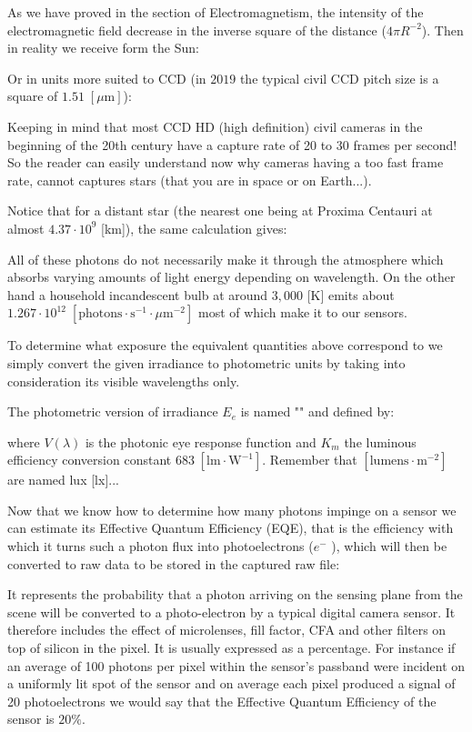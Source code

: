 	As we have proved in the section of Electromagnetism, the intensity of the electromagnetic field decrease in the inverse square of the distance ($4\pi R^{-2}$). Then in reality we receive form the Sun:
	
	Or in units more suited to CCD (in $2019$ the typical civil CCD pitch size is a square of $1.51\;[\mu\text{m}]$):
	
	Keeping in mind that most CCD HD (high definition) civil cameras in the beginning of the 20th century have a capture rate of 20 to 30 frames per second! So the reader can easily understand now why cameras having a too fast frame rate, cannot captures stars (that you are in space or on Earth...).
	
	\begin{tcolorbox}[title=Remark,colframe=black,arc=10pt]
	Notice that for a distant star (the nearest one being at Proxima Centauri at almost $4.37\cdot 10^9$ [km]), the same calculation gives:
	 
	\end{tcolorbox}
	
	All of these photons do not necessarily make it through the atmosphere which absorbs varying amounts of light energy depending on wavelength.  On the other hand a household incandescent bulb at around $3,000$ [K] emits about $1.267 \cdot 10^{12}\;[\text{photons}\cdot\text{s}^{-1}\cdot\mu\text{m}^{-2}]$ most of which make it to our sensors.
	
	To determine what exposure the equivalent quantities above correspond to we simply convert the given irradiance to photometric units by taking into consideration its visible wavelengths only.
	
	The photometric version of irradiance $E_e$ is named  "" and defined by:
	
	where $V(\lambda)$ is the photonic eye response function and $K_m$ the luminous efficiency conversion constant $683\;[\text{lm}\cdot\text{W}^{-1}]$.  Remember that $[\text{lumens}\cdot\text{m}^{-2}]$ are named lux [lx]...
	
	Now that we know how to determine how many photons impinge on a sensor we can estimate its Effective Quantum Efficiency (EQE), that is the efficiency with which it turns such a photon flux into photoelectrons ($e^-$ ), which will then be converted to raw data to be stored in the captured raw file:
	
	It represents the probability that a photon arriving on the sensing plane from the scene will be converted to a photo-electron by a typical digital camera sensor.  It therefore includes the effect of microlenses, fill factor, CFA and other filters on top of silicon in the pixel.  It is usually expressed as a percentage.  For instance if  an average of 100 photons per pixel within the sensor's passband were incident on a uniformly lit spot of the sensor and on average each pixel produced a signal of 20 photoelectrons we would say that the Effective Quantum Efficiency of the sensor is $20\%$.
	
